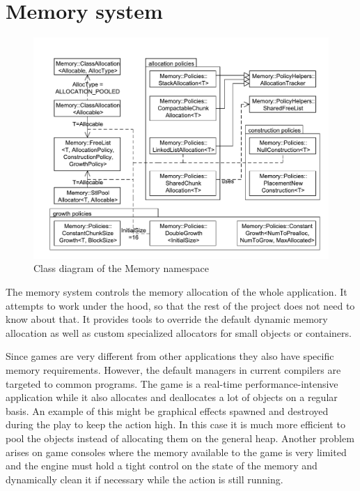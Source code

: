 \documentclass[a4paper, 12pt]{report}
\begin{document}
\chapter{Memory system}

\begin{figure}[htbp]
	\centering
		\includegraphics[width=1\textwidth]{MemoryClassDiagram.pdf}
	\caption{Class diagram of the Memory namespace}
	\label{fig:memory-diagram}
\end{figure}

The memory system controls the memory allocation of the whole application. It attempts to work under the hood, so that the rest of the project does not need to know about that. It provides tools to override the default dynamic memory allocation as well as custom specialized allocators for small objects or containers.

Since games are very different from other applications they also have specific memory requirements. However, the default managers in current compilers are targeted to common programs. The game is a real-time per\-for\-man\-ce-in\-ten\-si\-ve application while it also allocates and deallocates a lot of objects on a regular basis. An example of this might be graphical effects spawned and destroyed during the play to keep the action high. In this case it is much more efficient to pool the objects instead of allocating them on the general heap. Another problem arises on game consoles where the memory available to the game is very limited and the engine must hold a tight control on the state of the memory and dynamically clean it if necessary while the action is still running.
\end{document}
